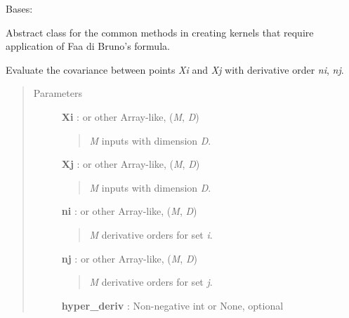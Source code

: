 \documentclass[letterpaper,10pt,english]{sphinxmanual}
\begin{document}
\begin{fulllineitems}
\label{gptools.kernel:gptools.kernel.core.ChainRuleKernel}
Bases: {\hyperref[gptools.kernel:gptools.kernel.core.Kernel]{}}

Abstract class for the common methods in creating kernels that require application of Faa di Bruno's formula.

\begin{fulllineitems}
\label{gptools.kernel:gptools.kernel.core.ChainRuleKernel.__call__}
Evaluate the covariance between points \emph{Xi} and \emph{Xj} with derivative order \emph{ni}, \emph{nj}.
\begin{quote}\begin{description}
\item[{Parameters}] \leavevmode
\textbf{Xi} :  or other Array-like, (\emph{M}, \emph{D})
\begin{quote}

\emph{M} inputs with dimension \emph{D}.
\end{quote}

\textbf{Xj} :  or other Array-like, (\emph{M}, \emph{D})
\begin{quote}

\emph{M} inputs with dimension \emph{D}.
\end{quote}

\textbf{ni} :  or other Array-like, (\emph{M}, \emph{D})
\begin{quote}

\emph{M} derivative orders for set \emph{i}.
\end{quote}

\textbf{nj} :  or other Array-like, (\emph{M}, \emph{D})
\begin{quote}

\emph{M} derivative orders for set \emph{j}.
\end{quote}

\textbf{hyper\_deriv} : Non-negative int or None, optional
\begin{quote}


\end{quote}
\end{description}
\end{quote}
\end{fulllineitems}
\end{fulllineitems}
\end{document}
